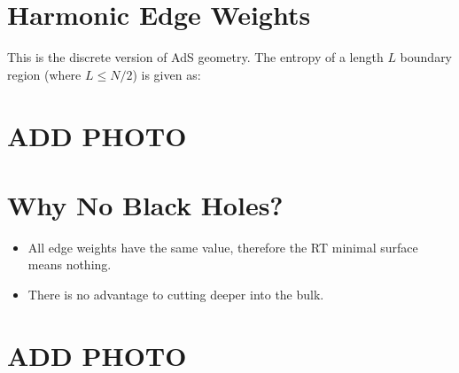 \documentclass{article}
\begin{document}
\section{Harmonic Edge Weights}
This is the discrete version of AdS geometry. The entropy of a length \( L \) boundary region (where \( L \leq N/2 \)) is given as:

\section{ADD PHOTO}

\section{Why No Black Holes?}
\begin{itemize}
    \item All edge weights have the same value, therefore the RT minimal surface means nothing.
    \item There is no advantage to cutting deeper into the bulk.
\end{itemize}

\section{ADD PHOTO}
\end{document}
